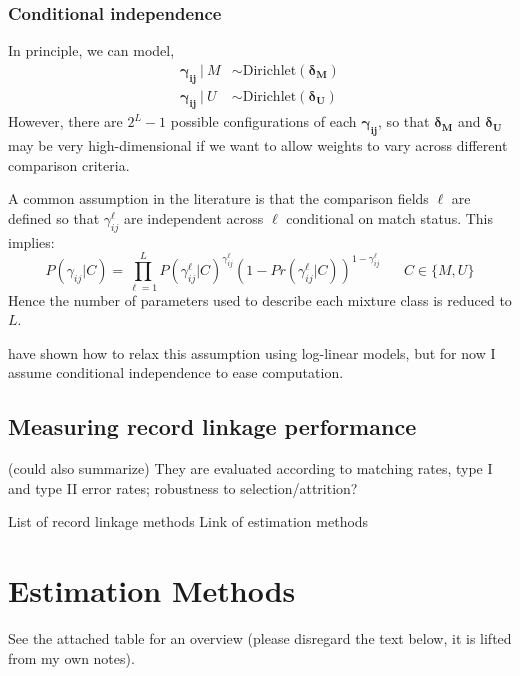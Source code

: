 \documentclass[12pt]{article}
\newcommand\gamij{\mathbf{\gamma_{ij}}}
\begin{document}
\subsubsection*{Conditional independence} In principle, we can model,
\begin{align*} \gamij\  |\  M &\sim \text{Dirichlet}(\mathbf{\delta_M})\\
\gamij\  |\  U &\sim \text{Dirichlet}(\mathbf{\delta_U}) \end{align*}
However, there are $2^{L}-1$ possible configurations of each $\gamij$, so that $\mathbf{\delta_M}$ and $\mathbf{\delta_U}$ may be very high-dimensional if we want to allow weights to vary across different comparison criteria.

A common assumption in the literature is that the comparison fields $\ell$ are defined so that $\gamma_{ij}^{\ell}$ are independent across $\ell$ conditional on match status.  This implies:
 \begin{equation} 
 P(\gamma_{ij} | C) = \prod_{\ell=1}^L P(\gamma_{ij}^{\ell} | C)^{\gamma_{ij}^{\ell}}(1-Pr(\gamma_{ij}^{\ell} | C))^{1-\gamma_{ij}^{\ell}} \hspace{20pt} C\in \{M, U\} 
 \label{eq:condInd}
 \end{equation}
Hence the number of parameters used to describe each mixture class is reduced to $L$.  

\cite{larsen_rubin_2001} have shown how to relax this assumption using log-linear models, but for now I assume conditional independence to ease computation. 


\subsection{Measuring record linkage performance}

(could also summarize)
They are evaluated according to matching rates, type I and type II error rates; robustness to selection/attrition? 


List of record linkage methods
Link of estimation methods

\section{Estimation Methods} 

See the attached table for an overview (please disregard the text below, it is lifted from my own notes). 

\subsection{\cite{ahl2019}}
\end{document}

